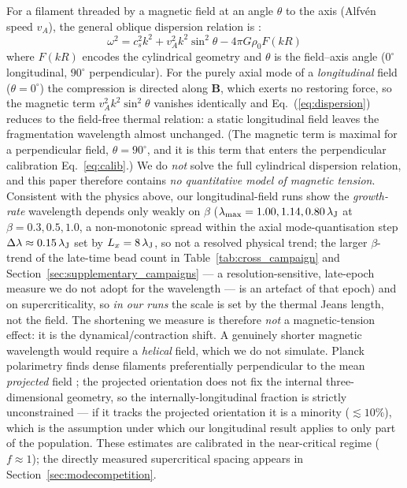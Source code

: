 \documentclass[usenatbib,twoside,twocolumn]{mnras}
\begin{document}
For a filament threaded by a magnetic field at an angle $\theta$ to the axis (Alfv\'en speed $v_A$), the general oblique dispersion relation is \citep{Nakamura1993}:
\begin{equation}
\omega^2 = c_s^2 k^2 + v_A^2 k^2 \sin^2\theta - 4\pi G\rho_0 F(kR)
\label{eq:dispersion}
\end{equation}
where $F(kR)$ encodes the cylindrical geometry and $\theta$ is the field--axis angle ($0^\circ$ longitudinal, $90^\circ$ perpendicular). For the purely axial mode of a \emph{longitudinal} field ($\theta=0^\circ$) the compression is directed along $\mathbf{B}$, which exerts no restoring force, so the magnetic term $v_A^2k^2\sin^2\theta$ vanishes identically and Eq.~(\ref{eq:dispersion}) reduces to the field-free thermal relation: a static longitudinal field leaves the fragmentation wavelength almost unchanged. (The magnetic term is maximal for a perpendicular field, $\theta=90^\circ$, and it is this term that enters the perpendicular calibration Eq.~\ref{eq:calib}.) We do \emph{not} solve the full cylindrical dispersion relation, and this paper therefore contains \emph{no quantitative model of magnetic tension}. Consistent with the physics above, our longitudinal-field runs show the \emph{growth-rate} wavelength depends only weakly on $\beta$ ($\lambda_{\rm max}=1.00,1.14,0.80\,\lambda_{\rm J}$ at $\beta=0.3,0.5,1.0$, a non-monotonic spread within the axial mode-quantisation step $\Delta\lambda\approx0.15\,\lambda_{\rm J}$ set by $L_x=8\,\lambda_{\rm J}$, so not a resolved physical trend; the larger $\beta$-trend of the late-time bead count in Table~\ref{tab:cross_campaign} and Section~\ref{sec:supplementary_campaigns} --- a resolution-sensitive, late-epoch measure we do not adopt for the wavelength --- is an artefact of that epoch) and on supercriticality, so \emph{in our runs} the scale is set by the thermal Jeans length, not the field. The shortening we measure is therefore \emph{not} a magnetic-tension effect: it is the dynamical/contraction shift. A genuinely shorter magnetic wavelength would require a \emph{helical} field, which we do not simulate. Planck polarimetry finds dense filaments preferentially perpendicular to the mean \emph{projected} field \citep{Jadhav2026}; the projected orientation does not fix the internal three-dimensional geometry, so the internally-longitudinal fraction is strictly unconstrained --- if it tracks the projected orientation it is a minority ($\lesssim10\%$), which is the assumption under which our longitudinal result applies to only part of the population. These estimates are calibrated in the near-critical regime ($f\approx1$); the directly measured supercritical spacing appears in Section~\ref{sec:modecompetition}.
\end{document}

